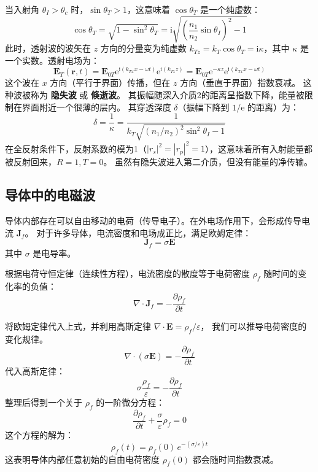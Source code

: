 \documentclass[fontset=none]{ctexart}
\begin{document}
当入射角 $\theta_I > \theta_c$ 时，$\sin\theta_T > 1$，这意味着 $\cos\theta_T$ 是一个纯虚数：
\begin{equation}
\cos\theta_T = \sqrt{1 - \sin^2\theta_T} 
= \mathrm{i}\sqrt{\left(\frac{n_1}{n_2}\sin\theta_I\right)^2 - 1}
\end{equation}
此时，透射波的波矢在 $z$ 方向的分量变为纯虚数 $k_{Tz} = k_T \cos\theta_T 
= \mathrm{i} \kappa$，其中 $\kappa$ 是一个实数。透射电场为：
\begin{equation}
\bm{E}_T(\bm{r}, t) 
= \bm{E}_{0T} \mathrm{e}^{\mathrm{i}(k_{Tx}x - \omega t)} \mathrm{e}^{\mathrm{i}(k_{Tz}z)} 
= \bm{E}_{0T} \mathrm{e}^{-\kappa z} \mathrm{e}^{\mathrm{i}(k_{Tx}x - \omega t)}
\end{equation}
这个波在 $x$ 方向（平行于界面）传播，但在 $z$ 方向（垂直于界面）指数衰减。
这种波被称为 \textbf{隐失波} 或 \textbf{倏逝波}。
其振幅随深入介质2的距离呈指数下降，能量被限制在界面附近一个很薄的层内。
其穿透深度 $\delta$（振幅下降到 $1/\mathrm{e}$ 的距离）为：
\begin{equation}
\delta = \frac{1}{\kappa} = \frac{1}{k_T \sqrt{(n_1/n_2)^2\sin^2\theta_I - 1}}
\end{equation}
在全反射条件下，反射系数的模为1（$|r_s|^2=|r_p|^2=1$），这意味着所有入射能量都被反射回来，$R=1, T=0$。
虽然有隐失波进入第二介质，但没有能量的净传输。

\subsection{导体中的电磁波}
导体内部存在可以自由移动的电荷（传导电子）。在外电场作用下，会形成传导电流 $\bm{J}_f$。
对于许多导体，电流密度和电场成正比，满足欧姆定律：
\begin{equation}
\bm{J}_f = \sigma \bm{E}
\end{equation}
其中 $\sigma$ 是电导率。

根据电荷守恒定律（连续性方程），电流密度的散度等于电荷密度 $\rho_f$ 随时间的变化率的负值：
\begin{equation}
    \nabla \cdot \bm{J}_f = -\frac{\partial \rho_f}{\partial t}
\end{equation}

将欧姆定律代入上式，并利用高斯定律 $\nabla \cdot \bm{E} = \rho_f / \varepsilon$，
我们可以推导电荷密度的变化规律。
\begin{equation}
    \nabla \cdot (\sigma \bm{E}) = -\frac{\partial \rho_f}{\partial t}
\end{equation}
代入高斯定律：
\begin{equation}
    \sigma \frac{\rho_f}{\varepsilon} = -\frac{\partial \rho_f}{\partial t}
\end{equation}
整理后得到一个关于 $\rho_f$ 的一阶微分方程：
\begin{equation}
    \frac{\partial \rho_f}{\partial t} + \frac{\sigma}{\varepsilon} \rho_f = 0
\end{equation}
这个方程的解为：
\begin{equation}
    \rho_f(t) = \rho_f(0) \, e^{-(\sigma/\varepsilon)t}
\end{equation}
这表明导体内部任意初始的自由电荷密度 $\rho_f(0)$ 都会随时间指数衰减。
\end{document}
